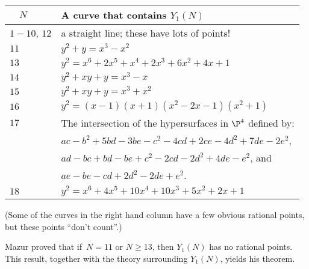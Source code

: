 \documentclass[11pt]{report}
\begin{document}
\begin{center}
  \begin{tabular}{|l|l|}\hline
    $\quad N$    & A curve that contains $Y_1(N)$                                             \\\hline
    $1-10$, $12$ & a straight line; these have lots of points!                                \\\hline
    $11$         & $y^2 + y = x^3 - x^2$                                                      \\\hline
    $13$         & $y^2 = x^6 + 2x^5 + x^4 + 2x^3 + 6x^2 + 4x + 1$                            \\\hline
    $14$         & $y^2 +xy +y = x^3-x$                                                       \\\hline
    $15$         & $y^2+xy+y = x^3+x^2$                                                       \\\hline
    $16$         & $y^2 = (x - 1)(x + 1)(x^2 - 2x - 1)(x^2 + 1)$                              \\\hline
    $17$         & The intersection of the hypersurfaces in $\P^4$ defined by:                \\
                 & \hspace{.3in}$ac - b^2 + 5bd - 3be - c^2 - 4cd + 2ce - 4d^2 + 7de - 2e^2$, \\
                 & \hspace{.3in}$ad - bc + bd - be + c^2 - 2cd - 2d^2 + 4de - e^2$, and       \\
                 & \hspace{.3in}$ae - be - cd + 2d^2 - 2de + e^2$.                            \\\hline
    $18$         & $y^2 = x^6 + 4x^5 + 10x^4 + 10x^3 + 5x^2 + 2x + 1$                         \\\hline
  \end{tabular}
\end{center}
(Some of the curves in the right hand column have a few obvious rational
points, but these points ``don't count''.)

Mazur proved that if~$N=11$ or $N\geq 13$, then $Y_1(N)$ has no
rational points.   This result, together with the theory surrounding
$Y_1(N)$, yields his theorem.
\end{document}
